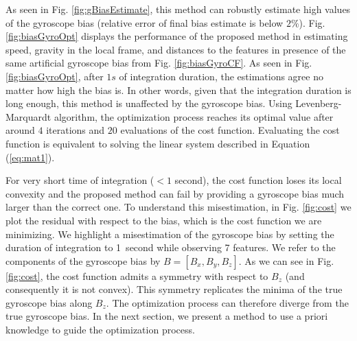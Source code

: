 \documentclass[letterpaper, 10 pt, journal, twoside]{IEEEtran}  %
\begin{document}



As seen in Fig. \ref{fig:gBiasEstimate}, this method can robustly estimate high values of the gyroscope bias (relative error of final bias estimate is below $2\%$).
Fig. \ref{fig:biasGyroOpt} displays the performance of the proposed method in estimating speed, gravity in the local frame, and distances to the features in presence of the same artificial gyroscope bias from Fig. \ref{fig:biasGyroCF}.
As seen in Fig. \ref{fig:biasGyroOpt}, after $1s$ of integration duration, the estimations agree no matter how high the bias is.
In other words, given that the integration duration is long enough, this method is unaffected by the gyroscope bias.
Using Levenberg-Marquardt algorithm, the optimization process reaches its optimal value after around $4$ iterations and $20$ evaluations of the cost function.
Evaluating the cost function is equivalent to solving the linear system described in Equation (\ref{eq:mat1}).

\noindent For very short time of integration ($<1$ second), the cost function loses its local convexity and the proposed method can fail by providing a gyroscope bias much larger than the correct one.
To understand this misestimation, in Fig. \ref{fig:cost} we plot the residual with respect to the bias, which is the cost function we are minimizing.
We highlight a misestimation of the gyroscope bias by setting the duration of integration to 1~second while observing 7 features.
We refer to the components of the gyroscope bias by $B = [B_x, B_y, B_z]$.
As we can see in Fig. \ref{fig:cost}, the cost function admits a symmetry with respect to $B_z$ (and consequently it is not convex).
This symmetry replicates the minima of the true gyroscope bias along $B_z$.
The optimization process can therefore diverge from the true gyroscope bias.
In the next section, we present a method to use a priori knowledge to guide the optimization process.
\end{document}
